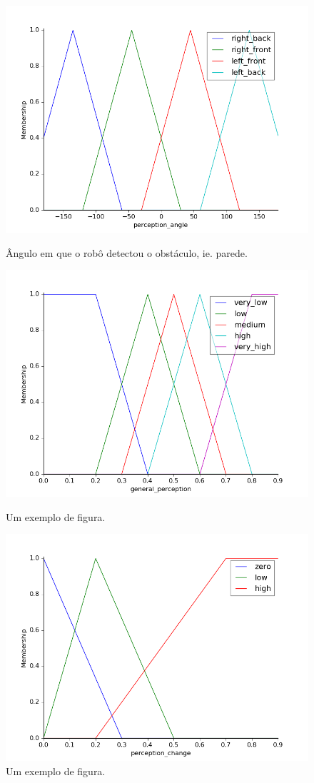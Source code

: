 \documentclass[twoside,conference,a4paper]{IEEEtran}
\begin{document}
\begin{figure}[]
  \centering
  \includegraphics[width=1\hsize]{figuras/per_angle.png}
  \caption{Ângulo em que o robô detectou o obstáculo, ie. parede.}
  \label{fig:fig1}
  \includegraphics[width=1\hsize]{figuras/per.png}
  \caption{Um exemplo de figura.}
  \label{fig:fig2}
  \includegraphics[width=1\hsize]{figuras/per_change.png}
  \caption{Um exemplo de figura.}
  \label{fig:fig3}


\end{figure}
\end{document}
